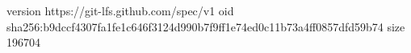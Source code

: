 version https://git-lfs.github.com/spec/v1
oid sha256:b9dccf4307fa1fe1c646f3124d990b7f9ff1e74ed0c11b73a4ff0857dfd59b74
size 196704
